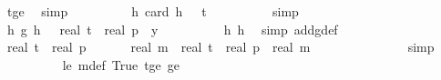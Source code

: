 \begin{isabellebody}
\ t{\isacharunderscore}{\kern0pt}ge{\isacharunderscore}{\kern0pt}{}\ \isamarkupfalse%
\ simp\isanewline
\ \ \ \ \ \ \isamarkupfalse%
\ \isamarkupfalse%
\ h{\isacharunderscore}{\kern0pt}{}{\isacharcolon}{\kern0pt}\ {\isachardoublequoteopen}card\ {\isacharparenleft}{\kern0pt}h\ {\isasymomega}{\isacharparenright}{\kern0pt}\ {\isacharequal}{\kern0pt}\ t{\isachardoublequoteclose}\isanewline
\ \ \ \ \ \ \ \ \isamarkupfalse%
\ simp\isanewline
\ \ \ \ \ \ \isamarkupfalse%
\ h{\isacharunderscore}{\kern0pt}{}{\isacharcolon}{\kern0pt}\ {\isachardoublequoteopen}g{\isacharprime}{\kern0pt}\ {\isacharparenleft}{\kern0pt}h\ {\isasymomega}{\isacharparenright}{\kern0pt}\ {\isacharequal}{\kern0pt}\ real\ t\ {\isacharasterisk}{\kern0pt}\ real\ p\ {\isacharslash}{\kern0pt}\ y{\isacharprime}{\kern0pt}{\isachardoublequoteclose}\isanewline
\ \ \ \ \ \ \ \ \isamarkupfalse%
\ h{\isacharunderscore}{\kern0pt}{}\ h{\isacharunderscore}{\kern0pt}{}\ \isamarkupfalse%
\ {\isacharparenleft}{\kern0pt}simp\ add{\isacharcolon}{\kern0pt}g{\isacharprime}{\kern0pt}{\isacharunderscore}{\kern0pt}def{\isacharparenright}{\kern0pt}\isanewline
\isanewline
\ \ \ \ \ \ \isamarkupfalse%
\ {\isachardoublequoteopen}{\isacharparenleft}{\kern0pt}real\ t{\isacharparenright}{\kern0pt}\ {\isacharasterisk}{\kern0pt}\ real\ p\ {\isasymle}\ \ {\isacharparenleft}{\kern0pt}{}\ {\isacharplus}{\kern0pt}\ {\isasymdelta}{\isacharprime}{\kern0pt}{\isacharparenright}{\kern0pt}\ {\isacharasterisk}{\kern0pt}\ real\ m\ {\isacharasterisk}{\kern0pt}\ {\isacharparenleft}{\kern0pt}{\isacharparenleft}{\kern0pt}real\ t{\isacharparenright}{\kern0pt}\ {\isacharasterisk}{\kern0pt}\ real\ p\ {\isacharslash}{\kern0pt}\ {\isacharparenleft}{\kern0pt}real\ m\ {\isacharasterisk}{\kern0pt}\ {\isacharparenleft}{\kern0pt}{}\ {\isacharplus}{\kern0pt}\ {\isasymdelta}{\isacharprime}{\kern0pt}{\isacharparenright}{\kern0pt}{\isacharparenright}{\kern0pt}{\isacharparenright}{\kern0pt}{\isachardoublequoteclose}\ \isanewline
\ \ \ \ \ \ \ \ \isamarkupfalse%
\ {\isacharparenleft}{\kern0pt}simp{\isacharparenright}{\kern0pt}\isanewline
\ \ \ \ \ \ \ \ \isamarkupfalse%
\ {\isasymdelta}{\isacharprime}{\kern0pt}{\isacharunderscore}{\kern0pt}le{\isacharunderscore}{\kern0pt}{}\ m{\isacharunderscore}{\kern0pt}def\ True\ t{\isacharunderscore}{\kern0pt}ge{\isacharunderscore}{\kern0pt}{}\ {\isasymdelta}{\isacharprime}{\kern0pt}{\isacharunderscore}{\kern0pt}ge{\isacharunderscore}{\kern0pt}{}\ \isamarkupfalse%

\end{isabellebody}
